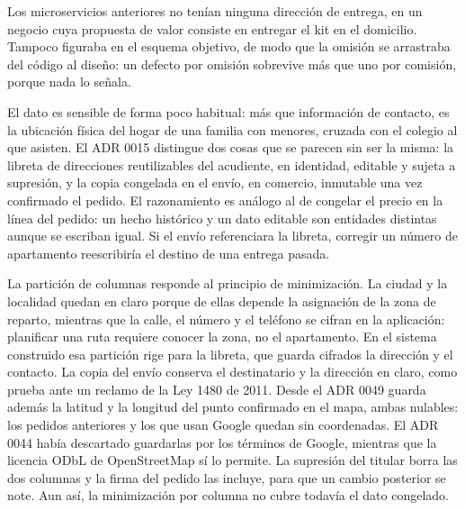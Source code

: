 Los microservicios anteriores no tenían ninguna dirección de entrega, en un negocio cuya
propuesta de valor consiste en entregar el kit en el domicilio. Tampoco figuraba en el
esquema objetivo, de modo que la omisión se arrastraba del código al diseño: un defecto por
omisión sobrevive más que uno por comisión, porque nada lo señala.

El dato es sensible de forma poco habitual: más que información de contacto, es la
ubicación física del hogar de una familia con menores, cruzada con el colegio al que
asisten. El ADR 0015 distingue dos cosas que se parecen sin ser la misma: la libreta de
direcciones reutilizables del acudiente, en identidad, editable y sujeta a supresión, y la
copia congelada en el envío, en comercio, inmutable una vez confirmado el pedido. El
razonamiento es análogo al de congelar el precio en la línea del pedido: un hecho histórico
y un dato editable son entidades distintas aunque se escriban igual. Si el envío
referenciara la libreta, corregir un número de apartamento reescribiría el destino de una
entrega pasada.

La partición de columnas responde al principio de minimización. La ciudad y la localidad
quedan en claro porque de ellas depende la asignación de la zona de reparto, mientras que
la calle, el número y el teléfono se cifran en la aplicación: planificar una ruta requiere
conocer la zona, no el apartamento. En el sistema construido esa partición rige para la
libreta, que guarda cifrados la dirección y el contacto. La copia del envío conserva el
destinatario y la dirección en claro, como prueba ante un reclamo de la Ley 1480 de 2011. Desde el
ADR 0049 guarda además la latitud y la longitud del punto confirmado en el mapa, ambas nulables:
los pedidos anteriores y los que usan Google quedan sin coordenadas. El ADR 0044 había descartado
guardarlas por los términos de Google, mientras que la licencia ODbL de OpenStreetMap sí lo
permite. La supresión del titular borra las dos columnas y la firma del pedido las incluye, para
que un cambio posterior se note. Aun así, la minimización por columna no cubre todavía el dato
congelado.
